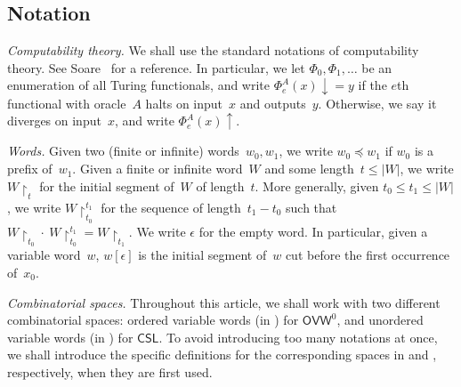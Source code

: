 \documentclass{article}
\newcommand{\uh}{\upharpoonright}
\newcommand{\CSL}[0]{\mathsf{CSL}}
\newcommand{\OVW}[0]{\mathsf{OVW}}
\numberwithin{theorem}{section}
\theoremstyle{definition}
\begin{document}
\subsection{Notation}

\emph{Computability theory.} We shall use the standard notations of computability theory. See Soare~\cite{soareTuringComputability2016} for a reference. In particular, we let $\Phi_0, \Phi_1, \dots$ be an enumeration of all Turing functionals, and write $\Phi^A_e(x)\downarrow = y$ if the $e$th functional with oracle~$A$ halts on input~$x$ and outputs~$y$. Otherwise, we say it diverges on input~$x$, and write $\Phi^A_e(x)\uparrow$.
\smallskip

\noindent
\emph{Words.} Given two (finite or infinite) words~$w_0, w_1$, we write $w_0 \preceq w_1$ if $w_0$ is a prefix of~$w_1$.
Given a finite or infinite word~$W$ and some length~$t \leq |W|$, we write $W \uh_t$ for the initial segment of~$W$ of length~$t$. More generally, given $t_0 \leq t_1 \leq |W|$, we write $W \uh_{t_0}^{t_1}$ for the sequence of length~$t_1 - t_0$ such that $W \uh_{t_0} \cdot\ W \uh_{t_0}^{t_1} = W \uh_{t_1}$. We write $\epsilon$ for the empty word. In particular, given a variable word~$w$, $w[\epsilon]$ is the initial segment of~$w$ cut before the first occurrence of~$x_0$.
\smallskip

\noindent
\emph{Combinatorial spaces.} 
Throughout this article, we shall work with two different combinatorial spaces: ordered variable words (in ) for $\OVW^0$, and unordered variable words (in ) for $\CSL$. To avoid introducing too many notations at once, we shall introduce the specific definitions for the corresponding spaces in  and , respectively, when they are first used.

\end{document}
